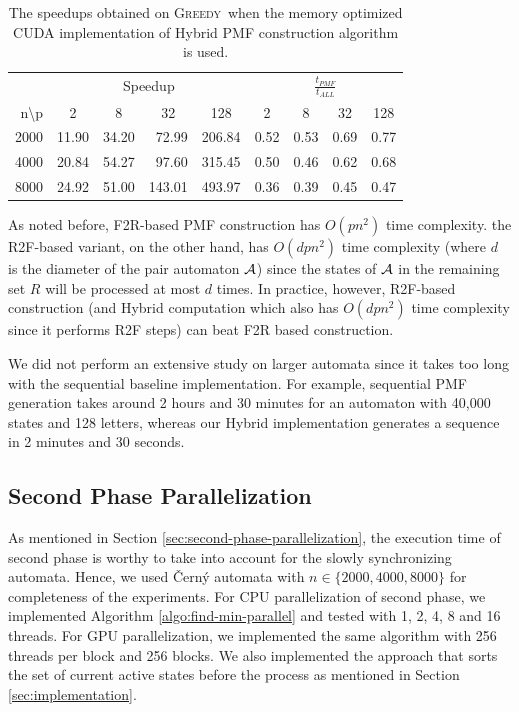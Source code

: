 \documentclass[12pt]{article}
\newcommand{\greedyAlgo}{\textsc{Greedy}}
\begin{document}
\begin{table}[ht]
	\center
	\begin{tabular}{r|rrrr||rrrr}
		& \multicolumn{4}{c||}{Speedup} & \multicolumn{4}{c}{$\frac{t_{PMF}}{t_{ALL}}$}\\ 
		n\textbackslash p  & \multicolumn{1}{c}{2} & \multicolumn{1}{c}{8} & \multicolumn{1}{c}{32} & \multicolumn{1}{c||}{128} & \multicolumn{1}{c}{2} & \multicolumn{1}{c}{8} & \multicolumn{1}{c}{32} & \multicolumn{1}{c}{128} \\ \hline
		2000 & 11.90 & 34.20 & 72.99 & 206.84 & 0.52 & 0.53 & 0.69 & 0.77 \\
		4000 & 20.84 & 54.27 & 97.60 & 315.45 & 0.50 & 0.46 & 0.62 & 0.68 \\
		8000 & 24.92 & 51.00 & 143.01 & 493.97 & 0.36 & 0.39 & 0.45 & 0.47 
	\end{tabular}
	\caption{The speedups obtained on \greedyAlgo\ when the memory optimized CUDA implementation of Hybrid PMF construction algorithm is used.}
	\label{table:phase-comparison-after}
\end{table}

As noted before, F2R-based PMF construction has $O(pn^2)$ time complexity. the R2F-based variant, on the other hand, has $O(dpn^2)$ time complexity (where $d$ is the diameter of the pair automaton ${\cal A}$) since the states of ${\cal A}$ in the remaining set $R$ will be processed at most $d$ times. In practice, however, R2F-based construction (and Hybrid computation which also has $O(dpn^2)$ time complexity since it performs R2F steps) can beat F2R based construction.

We did not perform an extensive study on larger automata since it takes too long with the sequential baseline implementation. For example, sequential PMF generation takes around 2 hours and 30 minutes for an automaton with 40,000 states and 128 letters, whereas our Hybrid implementation generates a sequence in 2 minutes and 30 seconds.

\subsection{Second Phase Parallelization}

As mentioned in Section \ref{sec:second-phase-parallelization}, the execution time of second phase is worthy to take into account for the slowly synchronizing automata. Hence, we used \v{C}ern\'y automata with $n \in \{ 2000, 4000, 8000 \}$ for completeness of the experiments. For CPU parallelization of second phase, we implemented Algorithm \ref{algo:find-min-parallel} and tested with 1, 2, 4, 8 and 16 threads. For GPU parallelization, we implemented the same algorithm with 256 threads per block and 256 blocks. We also implemented the approach that sorts the set of current active states before the process as mentioned in Section \ref{sec:implementation}.
\end{document}

